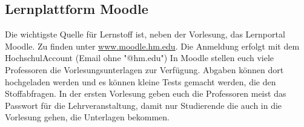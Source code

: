 \subsection{Lernplattform Moodle}
Die wichtigste Quelle für Lernstoff ist, neben der 
Vorlesung, das Lernportal Moodle. Zu finden  unter 
\url{www.moodle.hm.edu}. Die Anmeldung erfolgt mit dem HochschulAccount (Email ohne "@hm.edu") 
In Moodle stellen euch viele Professoren die Vorlesungsunterlagen 
zur Verfügung. Abgaben können dort hochgeladen werden und es 
können kleine Tests gemacht werden, die den Stoffabfragen. In der 
ersten Vorlesung geben euch die Professoren meist das Passwort für 
die Lehrveranstaltung, damit nur Studierende die auch in die Vorlesung 
gehen, die Unterlagen bekommen. 